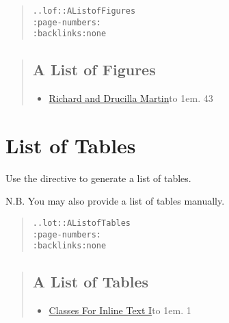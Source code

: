 \documentclass[a5paper]{book}
\begin{document}
\begin{german}
\begin{quote}
\begin{alltt}
.. lof:: A List of Figures
   :page-numbers:
   :backlinks: none
\end{alltt}
\end{quote}

\begin{quotation}\noindent
\begin{container}
%
\label{id7}%
\hypertarget{id7}{}%
%
\subsection*{A List of Figures}


\begin{itemize}
\item[] \hyperlink{figure-4}{Richard and Drucilla Martin}\leaders\hbox to 1em{\hss.\hss}\hfill{} 43
\end{itemize}
\end{container}
\end{quotation}

%
\label{list-of-tables}%
\hypertarget{list-of-tables}{}%
%
\section*{{\noindent}List of Tables}


Use the {} directive to generate a list of tables.\par

N.B. You may also provide a list of tables manually.\par

\begin{quote}
\begin{alltt}
.. lot:: A List of Tables
   :page-numbers:
   :backlinks: none
\end{alltt}
\end{quote}

\begin{quotation}\noindent
\begin{container}
%
\label{id8}%
\hypertarget{id8}{}%
%
\subsection*{A List of Tables}


\begin{itemize}
\item[] \hyperlink{table-46}{Classes For Inline Text I}\leaders\hbox to 1em{\hss.\hss}\hfill{} 1


\end{itemize}
\end{container}
\end{quotation}
\end{german}
\end{document}
